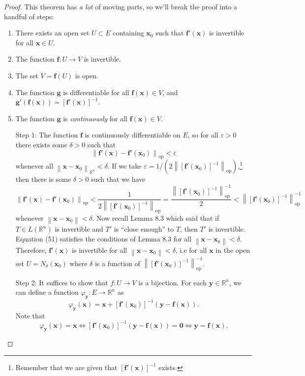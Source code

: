 \documentclass{article}
\newcommand{\R}{\mathbb{R}}
\newcommand{\x}{\mathbf{x}}
\newcommand{\f}{\mathbf{f}}
\newcommand{\y}{\mathbf{y}}
\newcommand{\ze}{\mathbf{0}}
\newcommand{\norm}[1]{\left\lVert#1\right\rVert}
\newcommand{\normop}[1]{\left\lVert#1\right\rVert_\text{op}}
\theoremstyle{definition}
\begin{document}
	\begin{proof}
		This theorem has \textit{a lot} of moving parts, so we'll break the proof into a handful of steps:
		\begin{enumerate}
			\item There exists an open set $ U\subset E $ containing $ \x_0 $ such that $ \f'(\x) $ is invertible for all $ \x \in U $. 
			\item The function $ \f:U\to V $ is invertible. 
			\item The set $ V = \f(U) $ is open. 
			\item The function $ \mathbf g $ is differentiable for all $ \f(\x)\in V $, and $ \mathbf g'(\f(\x)) = [\f'(\x)]^{-1}$. 
			\item The function $ \mathbf g $ is \textit{continuously} for all $ \f(\x)\in V $. 
		\end{enumerate}
		\begin{enumerate}
			\item [Step 1:]The function $ \f $ is continuously differentiable on $ E $, so for all $ \varepsilon > 0 $ there exists some $ \delta > 0 $ such that $$\normop{\f'(\x) - \f'(\x_0)} < \varepsilon$$ whenever all $ \norm{\x - \x_0}_{\R^n} < \delta $. If we take $ \varepsilon = 1/\left(2\normop{[\f'(\x_0)]^{-1}} \right)$,\footnote{Remember that we are given that $ [\f'(\x)]^{-1} $ exists.} then there is some $ \delta > 0$ such that we have 
			\begin{equation}\label{key}
				\normop{\f'(\x) - \f'(\x_0)} < \frac{1}{2\normop{[\f'(\x_0)]^{-1}}} = \frac{\normop{[\f'(\x_0)]^{-1}}^{-1}}{2} < \normop{[\f'(\x_0)]^{-1}}^{-1} 
			\end{equation} whenever $ \norm{\x - \x_0} < \delta $. Now recall Lemma 8.3 which said that if $ T\in L(\R^n) $ is invertible and $ T' $ is ``close enough'' to $ T $, then $ T' $ is invertible. Equation (51) satisfies the conditions of Lemma 8.3 for all $ \norm{\x-\x_0}<\delta $. Therefore, $ \f'(\x) $ is invertible for all $ \norm{\x-\x_0}<\delta $, i.e for all $ \x $ in the open set $U= N_\delta(\x_0) $ where $ \delta $ is a function of  $  \normop{[\f'(\x_0)]^{-1}}^{-1}   $. 
			\item [Step 2:]It suffices to show that $ f:U\to V $ is a bijection. For each $ \y\in\R^n $, we can define a function $ \varphi_\y:E\to \R^n $ as 
			$$ \varphi_\y(\x) = \x + [\f'(\x_0)]^{-1}(\y - \f(\x)) .$$ 
			Note that \begin{equation}\label{key}
				\varphi_\y(\x) = \x \iff [\f'(\x_0)]^{-1}(\y - \f(\x)) = \ze \iff \y = \f(\x) .

\end{equation}
\end{enumerate}
\end{proof}
\end{document}
